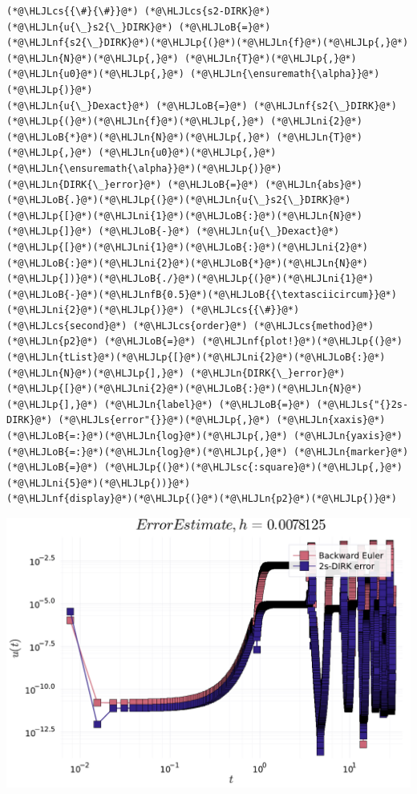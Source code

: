 \documentclass[12pt,a4paper]{article}
\newcommand{\HLJLn}[1]{#1}
\newcommand{\HLJLnf}[1]{\textcolor[RGB]{66,102,213}{#1}}
\newcommand{\HLJLs}[1]{\textcolor[RGB]{201,61,57}{#1}}
\newcommand{\HLJLsc}[1]{\textcolor[RGB]{201,61,57}{#1}}
\newcommand{\HLJLnfB}[1]{\textcolor[RGB]{59,151,46}{#1}}
\newcommand{\HLJLni}[1]{\textcolor[RGB]{59,151,46}{#1}}
\newcommand{\HLJLoB}[1]{\textcolor[RGB]{102,102,102}{\textbf{#1}}}
\newcommand{\HLJLp}[1]{#1}
\newcommand{\HLJLcs}[1]{\textcolor[RGB]{153,153,119}{\textit{#1}}}
\begin{document}
\begin{lstlisting}
(*@\HLJLcs{{\#}{\#}}@*) (*@\HLJLcs{s2-DIRK}@*)
(*@\HLJLn{u{\_}s2{\_}DIRK}@*) (*@\HLJLoB{=}@*) (*@\HLJLnf{s2{\_}DIRK}@*)(*@\HLJLp{(}@*)(*@\HLJLn{f}@*)(*@\HLJLp{,}@*) (*@\HLJLn{N}@*)(*@\HLJLp{,}@*) (*@\HLJLn{T}@*)(*@\HLJLp{,}@*) (*@\HLJLn{u0}@*)(*@\HLJLp{,}@*) (*@\HLJLn{\ensuremath{\alpha}}@*)(*@\HLJLp{)}@*)
(*@\HLJLn{u{\_}Dexact}@*) (*@\HLJLoB{=}@*) (*@\HLJLnf{s2{\_}DIRK}@*)(*@\HLJLp{(}@*)(*@\HLJLn{f}@*)(*@\HLJLp{,}@*) (*@\HLJLni{2}@*)(*@\HLJLoB{*}@*)(*@\HLJLn{N}@*)(*@\HLJLp{,}@*) (*@\HLJLn{T}@*)(*@\HLJLp{,}@*) (*@\HLJLn{u0}@*)(*@\HLJLp{,}@*) (*@\HLJLn{\ensuremath{\alpha}}@*)(*@\HLJLp{)}@*)
(*@\HLJLn{DIRK{\_}error}@*) (*@\HLJLoB{=}@*) (*@\HLJLn{abs}@*)(*@\HLJLoB{.}@*)(*@\HLJLp{(}@*)(*@\HLJLn{u{\_}s2{\_}DIRK}@*)(*@\HLJLp{[}@*)(*@\HLJLni{1}@*)(*@\HLJLoB{:}@*)(*@\HLJLn{N}@*)(*@\HLJLp{]}@*) (*@\HLJLoB{-}@*) (*@\HLJLn{u{\_}Dexact}@*)(*@\HLJLp{[}@*)(*@\HLJLni{1}@*)(*@\HLJLoB{:}@*)(*@\HLJLni{2}@*)(*@\HLJLoB{:}@*)(*@\HLJLni{2}@*)(*@\HLJLoB{*}@*)(*@\HLJLn{N}@*)(*@\HLJLp{])}@*)(*@\HLJLoB{./}@*)(*@\HLJLp{(}@*)(*@\HLJLni{1}@*)(*@\HLJLoB{-}@*)(*@\HLJLnfB{0.5}@*)(*@\HLJLoB{{\textasciicircum}}@*)(*@\HLJLni{2}@*)(*@\HLJLp{)}@*) (*@\HLJLcs{{\#}}@*) (*@\HLJLcs{second}@*) (*@\HLJLcs{order}@*) (*@\HLJLcs{method}@*)
(*@\HLJLn{p2}@*) (*@\HLJLoB{=}@*) (*@\HLJLnf{plot!}@*)(*@\HLJLp{(}@*)(*@\HLJLn{tList}@*)(*@\HLJLp{[}@*)(*@\HLJLni{2}@*)(*@\HLJLoB{:}@*)(*@\HLJLn{N}@*)(*@\HLJLp{],}@*) (*@\HLJLn{DIRK{\_}error}@*)(*@\HLJLp{[}@*)(*@\HLJLni{2}@*)(*@\HLJLoB{:}@*)(*@\HLJLn{N}@*)(*@\HLJLp{],}@*) (*@\HLJLn{label}@*) (*@\HLJLoB{=}@*) (*@\HLJLs{"{}2s-DIRK}@*) (*@\HLJLs{error"{}}@*)(*@\HLJLp{,}@*) (*@\HLJLn{xaxis}@*)(*@\HLJLoB{=:}@*)(*@\HLJLn{log}@*)(*@\HLJLp{,}@*) (*@\HLJLn{yaxis}@*)(*@\HLJLoB{=:}@*)(*@\HLJLn{log}@*)(*@\HLJLp{,}@*) (*@\HLJLn{marker}@*) (*@\HLJLoB{=}@*) (*@\HLJLp{(}@*)(*@\HLJLsc{:square}@*)(*@\HLJLp{,}@*)(*@\HLJLni{5}@*)(*@\HLJLp{))}@*)
(*@\HLJLnf{display}@*)(*@\HLJLp{(}@*)(*@\HLJLn{p2}@*)(*@\HLJLp{)}@*)
\end{lstlisting}

\includegraphics[width=\linewidth]{figures/ass_3_report_10_1.pdf}
\end{document}
